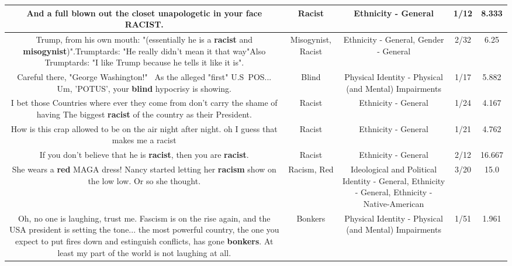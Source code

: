 \documentclass[11pt]{article}
\newlength\mylength
\begin{document}
\begin{center}
\begin{longtable}{|C{.65\mylength}|C{.30\mylength}|C{.12\mylength}|C{.12\mylength}|C{.12\mylength}|}
  \small And a full blown out the closet unapologetic in your face \textbf{RACIST}.\normalsize   & Racist & Ethnicity - General & 1/12 & 8.333 \\  \hline
  \small Trump, from his own mouth: "(essentially he is a \textbf{racist} and \textbf{misogynist})".Trumptards: "He really didn't mean it that way"Also Trumptards: "I like Trump because he tells it like it is".\normalsize   & Misogynist, Racist & Ethnicity - General, Gender - General & 2/32 & 6.25 \\  \hline
  \small Careful there, "George Washington!"  As the alleged "first" U.S POS... Um, 'POTUS', your \textbf{blind} hypocrisy is showing.\normalsize   & Blind & Physical Identity - Physical (and Mental) Impairments & 1/17 & 5.882 \\  \hline
  \small I bet those Countries where ever they come from don't carry the  shame of having The biggest \textbf{racist} of the country as their President.\normalsize   & Racist & Ethnicity - General & 1/24 & 4.167 \\  \hline
  \small How is this crap allowed to be on the air night after night. oh I guess that makes me a racist\normalsize   & Racist & Ethnicity - General & 1/21 & 4.762 \\  \hline
  \small If you don't believe that he is \textbf{racist}, then you are \textbf{racist}.\normalsize   & Racist & Ethnicity - General & 2/12 & 16.667 \\  \hline
  \small She wears a \textbf{r\textbf{ed}} MAGA dress! Nancy started letting her \textbf{racism} show on the low low.  Or so she thought.\normalsize   & Racism, Red &  Ideological and Political Identity - General, Ethnicity - General, Ethnicity - Native-American & 3/20 & 15.0 \\  \hline
  \small Oh, no one is laughing, trust me.  Fascism is on the rise again, and the USA president is setting the tone... the most powerful country, the one you expect to put fires down and estinguish conflicts, has gone \textbf{bonkers}. At least my part of the world is not laughing at all.\normalsize   & Bonkers & Physical Identity - Physical (and Mental) Impairments & 1/51 & 1.961 \\  \hline

\end{longtable}
\end{center}
\end{document}
